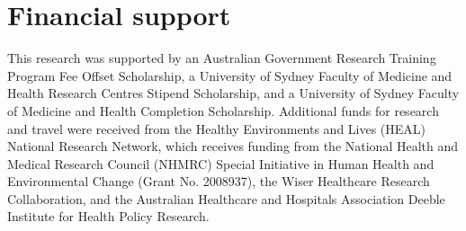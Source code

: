 \chapter{Financial support}
This research was supported by an Australian Government Research Training Program Fee Offset Scholarship, a University of Sydney Faculty of Medicine and Health Research Centres Stipend Scholarship, and a University of Sydney Faculty of Medicine and Health Completion Scholarship. Additional funds for research and travel were received from the Healthy Environments and Lives (HEAL) National Research Network, which receives funding from the National Health and Medical Research Council (NHMRC) Special Initiative in Human Health and Environmental Change (Grant No. 2008937), the Wiser Healthcare Research Collaboration, and the Australian Healthcare and Hospitals Association Deeble Institute for Health Policy Research.